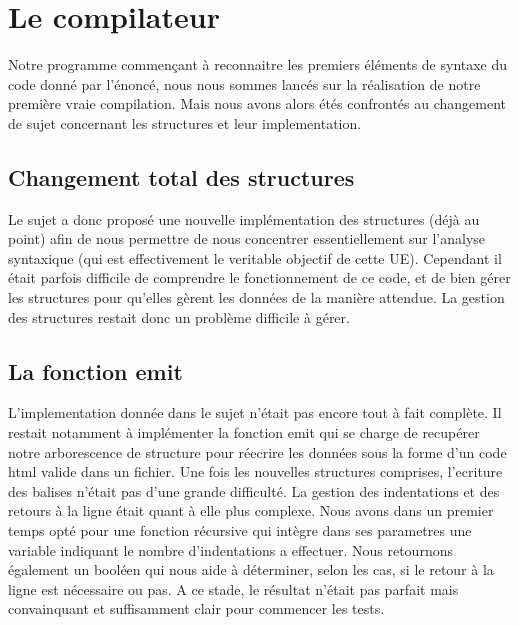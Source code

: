 \documentclass[12pt]{article}
\begin{document}
\newpage

\section{Le compilateur}

Notre programme commençant à reconnaitre les premiers éléments de syntaxe
du code donné par l'énoncé, nous nous sommes lancés sur la réalisation de notre
première vraie compilation.
\newline
\newline
Mais nous avons alors étés confrontés au changement de sujet concernant les structures
et leur implementation.

\subsection{Changement total des structures}

Le sujet a donc proposé une nouvelle implémentation des structures (déjà au point) afin de nous
permettre de nous concentrer essentiellement sur l'analyse syntaxique (qui est effectivement
le veritable objectif de cette UE). Cependant il était parfois difficile de comprendre
le fonctionnement de ce code, et de bien gérer les structures pour qu'elles gèrent les données
de la manière attendue. La gestion des structures restait donc un problème difficile
à gérer.

\subsection{La fonction emit}

L'implementation donnée dans le sujet n'était pas encore tout à fait complète.
Il restait notamment à implémenter la fonction emit qui se charge de recupérer
notre arborescence de structure pour réecrire les données sous la forme d'un code
html valide dans un fichier.
\newline
\newline
Une fois les nouvelles structures comprises, l'ecriture des balises n'était pas
d'une grande difficulté. La gestion des indentations et des retours à la ligne
était quant à elle plus complexe. Nous avons dans un premier temps opté pour
une fonction récursive qui intègre dans ses parametres une variable indiquant
le nombre d'indentations a effectuer. Nous retournons également un booléen qui
nous aide à déterminer, selon les cas, si le retour à la ligne est nécessaire ou pas.
\newline
A ce stade, le résultat n'était pas parfait mais convainquant et suffisamment clair
pour commencer les tests.
\end{document}
